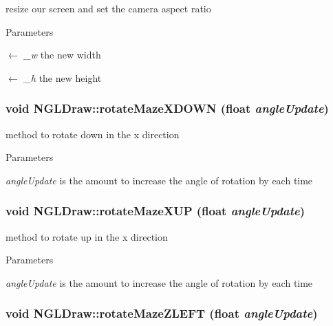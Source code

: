 resize our screen and set the camera aspect ratio 
\begin{DoxyParams}{Parameters}
\item[\mbox{$\leftarrow$} {\em \_\-w}]the new width \item[\mbox{$\leftarrow$} {\em \_\-h}]the new height \end{DoxyParams}
\hypertarget{classNGLDraw_a9c926f68084a0c0635bf46fe19bc253c}{
\subsubsection[{rotateMazeXDOWN}]{\setlength{\rightskip}{0pt plus 5cm}void NGLDraw::rotateMazeXDOWN (float {\em angleUpdate})}}
\label{classNGLDraw_a9c926f68084a0c0635bf46fe19bc253c}


method to rotate down in the x direction 
\begin{DoxyParams}{Parameters}
\item[{\em angleUpdate}]is the amount to increase the angle of rotation by each time \end{DoxyParams}
\hypertarget{classNGLDraw_aaf8beae970dc7a77cb7bfd56b875c412}{
\subsubsection[{rotateMazeXUP}]{\setlength{\rightskip}{0pt plus 5cm}void NGLDraw::rotateMazeXUP (float {\em angleUpdate})}}
\label{classNGLDraw_aaf8beae970dc7a77cb7bfd56b875c412}


method to rotate up in the x direction 
\begin{DoxyParams}{Parameters}
\item[{\em angleUpdate}]is the amount to increase the angle of rotation by each time \end{DoxyParams}
\hypertarget{classNGLDraw_a85f7d53c6fc180ca96a916d859e054da}{
\subsubsection[{rotateMazeZLEFT}]{\setlength{\rightskip}{0pt plus 5cm}void NGLDraw::rotateMazeZLEFT (float {\em angleUpdate})}}
\label{classNGLDraw_a85f7d53c6fc180ca96a916d859e054da}


